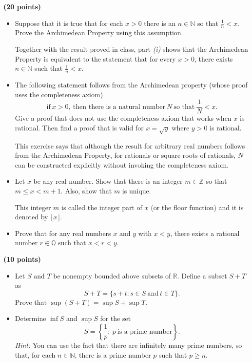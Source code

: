 \documentclass[11pt, oneside,usenames,dvipsnames]{article}
\begin{document}
{\begin{itemize}
\end{itemize}

\medskip




 {\bf (20 points)}  


\begin{itemize}
	\item[\it(i)] Suppose that it is true that for each $x > 0$ there is an $n \in \mathbb{N}$ so that $\frac1n < x$. Prove the Archimedean Property using this assumption.
	
	{\color{blue} Together with the result proved in class, part {\it (i)} shows that the Archimedean Property is equivalent to the statement that for every $x>0$, there exists $n\in \mathbb{N}$ such that $\frac1n < x.$}
	\item[\it(ii)] The following statement follows from the Archimedean property (whose proof uses the completeness axiom)
	$$
	 \text{if} \  x > 0, \ \text{then there is a natural number} \  N \ \text{so that} \	\frac1N < x.
	$$
	Give a proof that does not use the completeness axiom that works when $x$ is rational. Then find a proof that is valid for $x = \sqrt{y}$ where $y>0$ is rational.
	
	{\color{blue} This exercise says that although the result for arbitrary real numbers follows from the Archimedean Property, for rationals or square roots of rationals, $N$ can be constructed explicitly without invoking the completeness axiom.}
	\item[\it(iii)] Let $x$ be any real number. Show that there is an integer $m \in \mathbb{Z}$ so that $m \leq x < m+1$.
	Also, show that $m$ is unique.
	
	{\color{blue} 
	This integer $m$ is called the integer part of $x$ (or the floor function) and it is denoted by $\lfloor x \rfloor$.
	}

	\item[\it(iv)] Prove that for any real numbers $x$ and $y$  with $x < y$, there exists a rational number $r \in \mathbb{Q}$ such that $x < r < y.$ 
\end{itemize}


\medskip


 {\bf (10 points)}



\begin{itemize}		
	\item[\it(i)] Let $S$ and $T$ be nonempty bounded above subsets of $\mathbb{R}$. Define a subset $S+ T$ as
	$$
	S + T = \{ s + t: s \in S \ \text{and} \ t \in T\}.
	$$
	Prove that  $\sup (S + T) = \sup S + \sup T.$
	\item[\it(ii)] Determine $\inf S$ and $\sup S$ for the set
	$$
	S= \left\{\frac1p: \ p \ \text{is a prime number}\right\}.
	$$ 
	{{\it Hint:} You can use the fact that there are infinitely many prime numbers, so that, for each $n \in \mathbb{N}$, there is a prime number $p$ such that $p \geq n$.}
\end{itemize}


}
\end{document}
